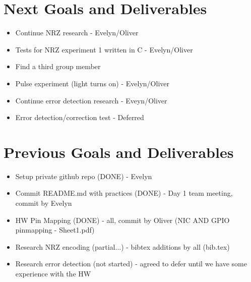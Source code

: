 \documentclass{article}
\begin{document}
\section*{Next Goals and Deliverables}
\begin{itemize}
\item Continue NRZ research - Evelyn/Oliver
\item Tests for NRZ experiment 1 written in C - Evelyn/Oliver
\item Find a third group member
\item Pulse experiment (light turns on) - Evelyn/Oliver
\item Continue error detection research - Eveyn/Oliver
\item Error detection/correction test - Deferred
\end{itemize}
\section*{Previous Goals and Deliverables}
\begin{itemize}
\item Setup private github repo (DONE) - Evelyn
\item Commit README.md with practices (DONE) - Day 1 team meeting, commit by Evelyn
\item HW Pin Mapping (DONE) - all, commit by Oliver (NIC AND GPIO pinmapping - Sheet1.pdf)
\item Research NRZ encoding (partial...) - bibtex additions by all (bib.tex)
\item Research error detection (not started) - agreed to defer until we have some experience with the HW
\end{itemize}
\end{document}
